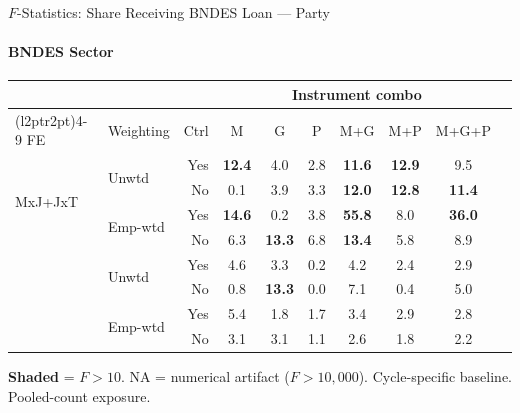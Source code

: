 \documentclass[aspectratio=169,10pt]{beamer}
\newcommand{\fpass}[1]{\cellcolor{pass}\textbf{#1}}
\begin{document}
\begin{frame}[t]{$F$-Statistics: Share Receiving BNDES Loan --- Party}
\framesubtitle{BNDES Sector}
\begin{center}
\footnotesize
\setlength{\tabcolsep}{3.5pt}
\renewcommand{\arraystretch}{1.05}
\begin{tabular}{@{}llrccccccc@{}}
\toprule
 & & & \multicolumn{6}{c}{Instrument combo} \\
\cmidrule(l{2pt}r{2pt}){4-9}
FE & Weighting & Ctrl & M & G & P & M+G & M+P & M+G+P \\
\midrule
  \multirow{4}{*}{MxJ+JxT} & \multirow{2}{*}{Unwtd} & Yes & \fpass{12.4} & 4.0 & 2.8 & \fpass{11.6} & \fpass{12.9} & 9.5 \\
   &  & No & 0.1 & 3.9 & 3.3 & \fpass{12.0} & \fpass{12.8} & \fpass{11.4} \\
   & \multirow{2}{*}{Emp-wtd} & Yes & \fpass{14.6} & 0.2 & 3.8 & \fpass{55.8} & 8.0 & \fpass{36.0} \\
   &  & No & 6.3 & \fpass{13.3} & 6.8 & \fpass{13.4} & 5.8 & 8.9 \\
\addlinespace[5pt]
  \multirow{4}{*}{MxJ+MxT} & \multirow{2}{*}{Unwtd} & Yes & 4.6 & 3.3 & 0.2 & 4.2 & 2.4 & 2.9 \\
   &  & No & 0.8 & \fpass{13.3} & 0.0 & 7.1 & 0.4 & 5.0 \\
   & \multirow{2}{*}{Emp-wtd} & Yes & 5.4 & 1.8 & 1.7 & 3.4 & 2.9 & 2.8 \\
   &  & No & 3.1 & 3.1 & 1.1 & 2.6 & 1.8 & 2.2 \\
\bottomrule
\end{tabular}
\end{center}
{\scriptsize \colorbox{pass}{\textbf{Shaded}} = $F>10$. NA = numerical artifact ($F>10{,}000$). Cycle-specific baseline. Pooled-count exposure.}
\end{frame}
\end{document}
